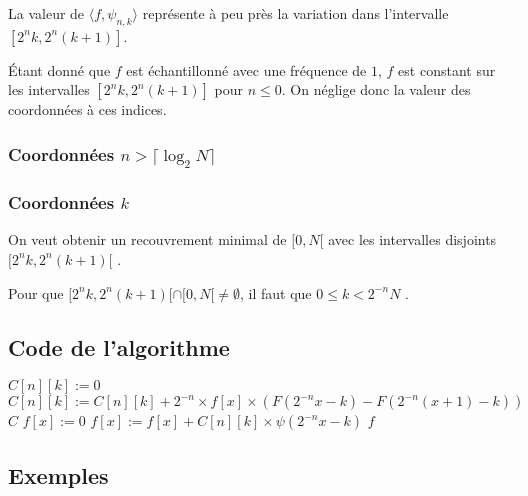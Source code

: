 \documentclass[]{article}
\theoremstyle{remark}
\theoremstyle{definition}
\begin{document}
La valeur de $\langle f,\psi_{n,k}\rangle$ représente à peu près la variation dans l'intervalle $[2^{n}k,2^{n}(k+1)]$.

Étant donné que $f$ est échantillonné avec une fréquence de $1$, $f$ est constant sur les intervalles $[2^{n}k,2^{n}(k+1)]$ pour $n\le 0$. On néglige donc la valeur des coordonnées à ces indices.

\subsubsection{Coordonnées $n > \lceil\log_2 N\rceil$}

\subsubsection{Coordonnées $k$}

On veut obtenir un recouvrement minimal de $[0,N[$ avec les intervalles disjoints $[2^{n}k,2^{n}(k+1)[$ .

Pour que $[2^{n}k,2^{n}(k+1)[\cap[0,N[\neq\emptyset$, il faut que $0\le k< 2^{-n}N$ .

\subsection{Code de l'algorithme}
\begin{algorithm}
\begin{algorithmic}[1]
\State $C[n][k] := 0$
\State $C[n][k] := C[n][k] + 2^{-n}\times f[x]\times\left(F(2^{-n}x-k)-F(2^{-n}(x+1)-k)\right)$
\EndFor
\EndFor
\EndFor
\State \Return $C$
\EndProcedure
\Statex
{}
\State $f[x] := 0$
\State $f[x] := f[x] + C[n][k]\times\psi(2^{-n}x-k)$
\EndFor
\EndFor
\EndFor
\State \Return $f$
\EndProcedure
\end{algorithmic}
\end{algorithm}



\subsection{Exemples}
\end{document}
